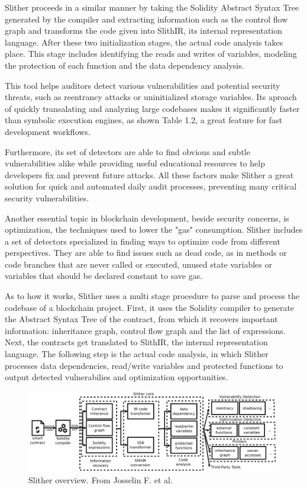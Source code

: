 Slither\cite{slither} proceeds in a similar manner by taking the Solidity Abstract Syntax Tree generated by the compiler and extracting information such as the control flow graph and transforms the code given into SlithIR, its internal representation language. After these two initialization stages, the actual code analysis takes place. This stage includes identifying the reads and writes of variables, modeling the protection of each function and the data dependency analysis.

This tool\cite{slither} helps auditors detect various vulnerabilities and potential security threats, such as reentrancy attacks or uninitialized storage variables. Its aproach of quickly transalating and analyzing large codebases makes it significantly faster than symbolic execution engines, as shown Table 1.2, a great feature for fast development workflows.

Furthermore, its set of detectors are able to find obvious and subtle vulnerabilities alike while providing useful educational resources to help developers fix and prevent future attacks. All these factors make Slither a great solution for quick and automated daily audit processes, preventing many critical security vulnerabilities.

Another essential topic in blockchain development, beside security concerns, is optimization, the techniques used to lower the "gas" consumption. Slither includes a set of detectors specialized in finding ways to optimize code\cite{slitherGitHub} from different perspectives. They are able to find issues such as dead code, as in methods or code branches that are never called or executed, unused state variables or variables that should be declared constant to save gas.

As to how it works\cite{slither}, Slither uses a multi stage procedure to parse and process the codebase of a blockchain project. First, it uses the Solidity compiler to generate the Abstract Syntax Tree of the contract, from which it recovers important information: inheritance graph, control flow graph and the list of expressions. Next, the contracts get translated to SlithIR, the internal representation language. The following step is the actual code analysis, in which Slither processes data dependencies, read/write variables and protected functions to output detected vulnerabilies and optimization opportunities. 

\begin{figure}[h ]
    \centering
    \includegraphics[width=1\linewidth]{images/image.png}
    \caption{Slither overview. From Josselin F. et al.\cite{slither}}
    \label{fig:enter-label}
\end{figure}